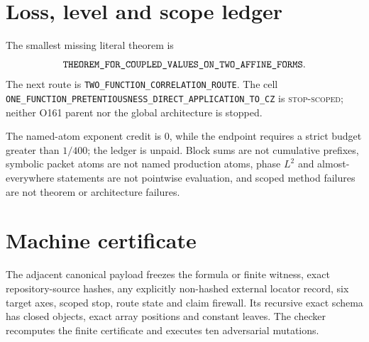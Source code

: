 \documentclass[11pt]{article}
\begin{document}
\section{Loss, level and scope ledger}
The smallest missing literal theorem is
\[
\texttt{THEOREM\_\allowbreak{}FOR\_\allowbreak{}COUPLED\_\allowbreak{}VALUES\_\allowbreak{}ON\_\allowbreak{}TWO\_\allowbreak{}AFFINE\_\allowbreak{}FORMS}.
\]
The next route is \texttt{TWO\_\allowbreak{}FUNCTION\_\allowbreak{}CORRELATION\_\allowbreak{}ROUTE}.
The cell \texttt{ONE\_\allowbreak{}FUNCTION\_\allowbreak{}PRETENTIOUSNESS\_\allowbreak{}DIRECT\_\allowbreak{}APPLICATION\_\allowbreak{}TO\_\allowbreak{}CZ} is \textsc{stop-scoped}; neither O161 parent nor the global architecture is stopped.

The named-atom exponent credit is \(0\), while the endpoint requires a
strict budget greater than \(1/400\); the ledger is unpaid.  Block sums are
not cumulative prefixes, symbolic packet atoms are not named production
atoms, phase \(L^2\) and almost-everywhere statements are not pointwise
evaluation, and scoped method failures are not theorem or architecture
failures.

\section{Machine certificate}
The adjacent canonical payload freezes the formula or finite witness,
exact repository-source hashes, any explicitly non-hashed external locator
record, six target axes, scoped stop, route state and claim firewall.  Its
recursive exact schema has closed objects, exact array positions and
constant leaves.  The checker recomputes the finite certificate and executes
ten adversarial mutations.



\end{document}
